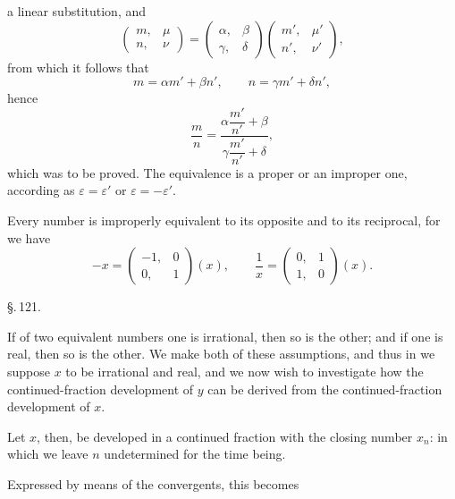 a linear substitution, and
\[
\begin{pmatrix}m, & \mu\\ n, & \nu\end{pmatrix} = \begin{pmatrix}\alpha, & \beta\\ \gamma, & \delta\end{pmatrix}\begin{pmatrix}m', & \mu'\\ n', & \nu'\end{pmatrix},
\]
from which it follows that
\[
m = \alpha m' + \beta n', \qquad n = \gamma m' + \delta n',
\]
hence
\[
\frac{m}{n} = \dfrac{\alpha\dfrac{m'}{n'}+\beta}{\gamma\dfrac{m'}{n'}+\delta},
\]
which was to be proved. The equivalence is a proper or an improper one, according as $\varepsilon = \varepsilon'$ or $\varepsilon = -\varepsilon'$.

Every number is improperly equivalent to its opposite and to its reciprocal, for we have
\[
-x = \begin{pmatrix}-1, & 0\\ 0, & 1\end{pmatrix}(x), \qquad \frac{1}{x} = \begin{pmatrix}0, & 1\\ 1, & 0\end{pmatrix}(x).
\]

\begin{center}
\S.\,121.

\end{center}

If of two equivalent numbers one is irrational, then so is the other; and if one is real, then so is the other. We make both of these assumptions, and thus in
we suppose $x$ to be irrational and real, and we now wish to investigate how the continued-fraction development of $y$ can be derived from the continued-fraction development of $x$.

Let $x$, then, be developed in a continued fraction with the closing number $x_n$:
in which we leave $n$ undetermined for the time being.

Expressed by means of the convergents, this becomes
